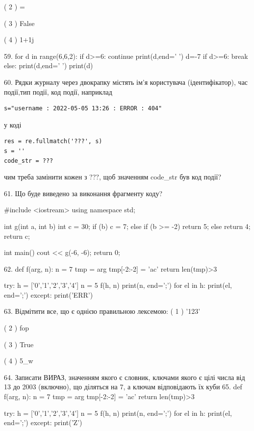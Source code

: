 \documentclass[11pt]{article}
\begin{document}
( 2 ) =

( 3 ) False

( 4 ) 1+1j

59. 
for d in range(6,6,2):
    if d>=6:
        continue
        print(d,end=' ')
        d=-7
    if d>=6:
        break
    else:
        print(d,end=' ')
    print(d)

60. 
Рядки журналу через двокрапку містять ім'я користувача (ідентифікатор), час події,тип події, код події, наприклад
\begin{verbatim}
s="username : 2022-05-05 13:26 : ERROR : 404"
\end{verbatim}
у коді 
\begin{verbatim}
res = re.fullmatch('???', s) 
s = ''
code_str = ??? 
\end{verbatim}
чим треба замінити кожен з ???, щоб значенням code\_str був код події? 



61. Що буде виведено за виконання фрагменту коду?

#include <iostream>
using namespace std;

int g(int a, int b){
    int c = 30;
    if (b)
        c = 7;
    else if (b >= -2)
         return 5;
    else 
        return 4;
    return c;
}

int main(){
    cout << g(-6, -6);
    return 0;
}

62. 
def f(arg, n):
    n = 7
    tmp = arg
    tmp[-2:-2] = 'ac'
    return len(tmp)>3

try:
    h = ['0','1','2','3','4']
    n = 5
    f(h, n)
    print(n, end=';')
    for el in h:
        print(el, end=';')
except:
    print('ERR')

63. %
Відмітити все, що є однією правильною лексемою:
( 1 ) '123'

( 2 ) fop

( 3 ) True

( 4 ) 5_w

64. 
Записати ВИРАЗ, значенням якого є словник, ключами якого є цілі числа від 13 до 2003 (включно), що діляться на 7, а ключам відповідають їх куби 
65. 
def f(arg, n):
    n = 7
    tmp = arg
    tmp[-2:-2] = 'ac'
    return len(tmp)>3

try:
    h = ['0','1','2','3','4']
    n = 5
    f(h, n)
    print(n, end=';')
    for el in h:
        print(el, end=';')
except:
    print('Z')
\end{document}
